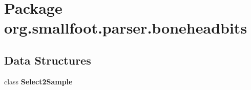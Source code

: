 \section{Package org.\+smallfoot.\+parser.\+boneheadbits}
\label{namespaceorg_1_1smallfoot_1_1parser_1_1boneheadbits}
\subsection*{Data Structures}
\begin{DoxyCompactItemize}
\item 
class {\bf Select2\+Sample}
\end{DoxyCompactItemize}
